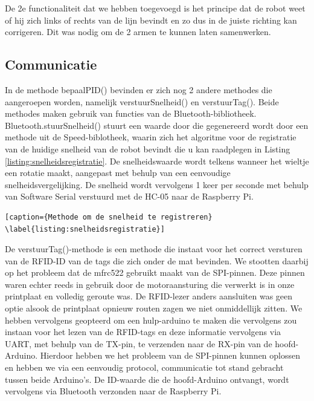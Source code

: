 De 2e functionaliteit dat we hebben toegevoegd is het principe dat de robot weet of hij zich links of rechts van de lijn bevindt en zo dus in de juiste richting kan corrigeren. Dit was nodig om de 2 armen te kunnen laten samenwerken.


\subsection {Communicatie}

In de methode bepaalPID() bevinden er zich nog 2 andere methodes die aangeroepen worden, namelijk verstuurSnelheid() en verstuurTag(). Beide methodes maken gebruik van functies van de Bluetooth-bibliotheek. Bluetooth.stuurSnelheid() stuurt een waarde door die gegenereerd wordt door een methode uit de Speed-biblotheek, waarin zich het algoritme voor de registratie van de huidige snelheid van de robot bevindt die u kan raadplegen in Listing \ref{listing:snelheidsregistratie}. De snelheidswaarde wordt telkens wanneer het wieltje een rotatie maakt, aangepast met behulp van een eenvoudige snelheidsvergelijking. De snelheid wordt vervolgens 1 keer per seconde met behulp van Software Serial verstuurd met de HC-05 naar de Raspberry Pi. 


\begin{lstlisting}[caption={Methode om de snelheid te registreren} \label{listing:snelheidsregistratie}]
\end{lstlisting}

De verstuurTag()-methode is een methode die instaat voor het correct versturen van de RFID-ID van de tags die zich onder de mat bevinden. We stootten daarbij op het probleem dat de mfrc522 gebruikt maakt van de SPI-pinnen. Deze pinnen waren echter reeds in gebruik door de motoraansturing die verwerkt is in onze printplaat en volledig geroute was. De RFID-lezer anders aansluiten was geen optie alsook de printplaat opnieuw routen zagen we niet onmiddellijk zitten. We hebben vervolgens geopteerd om een hulp-arduino te maken die vervolgens zou instaan voor het lezen van de RFID-tags en deze informatie vervolgens via UART, met behulp van de TX-pin, te verzenden naar de RX-pin van de hoofd-Arduino. Hierdoor hebben we het probleem van de SPI-pinnen kunnen oplossen en hebben we via een eenvoudig protocol, communicatie tot stand gebracht tussen beide Arduino's. De ID-waarde die de hoofd-Arduino ontvangt, wordt vervolgens via Bluetooth verzonden naar de Raspberry Pi.

